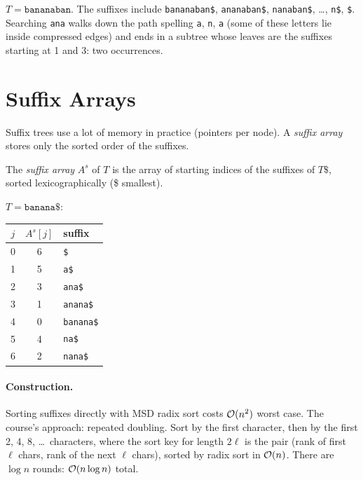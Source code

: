 \begin{example}
$T = \texttt{bananaban}$. The suffixes include \texttt{bananaban\$},
\texttt{ananaban\$}, \texttt{nanaban\$}, \ldots, \texttt{n\$}, \texttt{\$}.
Searching \texttt{ana} walks down the path spelling \texttt{a}, \texttt{n},
\texttt{a} (some of these letters lie inside compressed edges) and ends in a
subtree whose leaves are the suffixes starting at 1 and 3: two occurrences.
\end{example}

\section{Suffix Arrays}

Suffix trees use a lot of memory in practice (pointers per node). A
\emph{suffix array} stores only the sorted order of the suffixes.

\begin{definition}
The \emph{suffix array} $A^s$ of $T$ is the array of starting indices of the
suffixes of $T\$$, sorted lexicographically (\$ smallest).
\end{definition}

\begin{example}
$T = \texttt{banana\$}$:
\begin{center}
\begin{tabular}{ccl}
\toprule
$j$ & $A^s[j]$ & suffix\\
\midrule
0 & 6 & \texttt{\$}\\
1 & 5 & \texttt{a\$}\\
2 & 3 & \texttt{ana\$}\\
3 & 1 & \texttt{anana\$}\\
4 & 0 & \texttt{banana\$}\\
5 & 4 & \texttt{na\$}\\
6 & 2 & \texttt{nana\$}\\
\bottomrule
\end{tabular}
\end{center}
\end{example}

\paragraph{Construction.} Sorting suffixes directly with MSD radix sort costs
$\mathcal{O}(n^2)$ worst case. The course's approach: repeated doubling. Sort by the
first character, then by the first 2, 4, 8, \ldots\ characters, where the sort
key for length $2\ell$ is the pair (rank of first $\ell$ chars, rank of the next
$\ell$ chars), sorted by radix sort in $\mathcal{O}(n)$. There are $\log n$ rounds:
$\mathcal{O}(n \log n)$ total.


